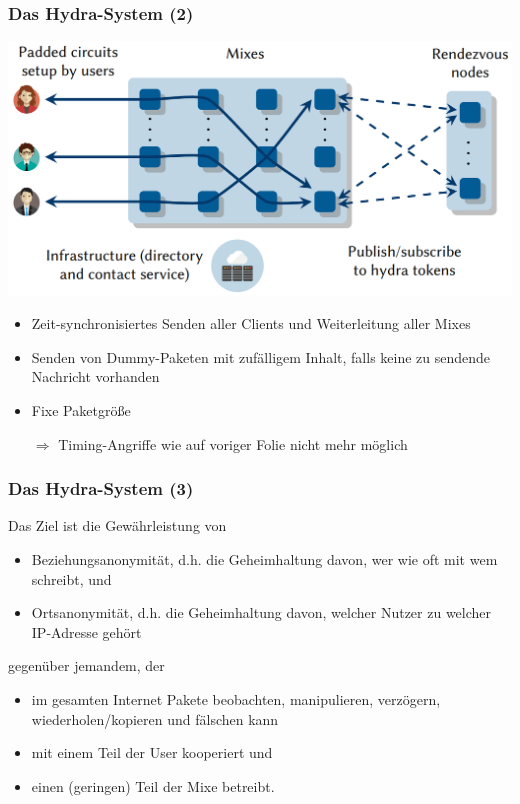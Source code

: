 \documentclass[t]{beamer}
\begin{document}
    \begin{frame}
        \frametitle{Das Hydra-System (2)}

        \centering\includegraphics[scale=0.25]{hydra_design.png}

        \begin{itemize}
            \item
                Zeit-synchronisiertes Senden aller Clients und Weiterleitung aller Mixes
                \pause

            \item
                Senden von Dummy-Paketen mit zufälligem Inhalt, falls keine zu sendende Nachricht vorhanden
                \pause

            \item
                Fixe Paketgröße
                \pause
            \item[$\Rightarrow$]
                Timing-Angriffe wie auf voriger Folie nicht mehr möglich
        \end{itemize}
    \end{frame}

    \begin{frame}
        \frametitle{Das Hydra-System (3)}
        \pause

        Das Ziel ist die Gewährleistung von
        \begin{itemize}
            \item
                Beziehungsanonymität, d.h. die Geheimhaltung davon, wer wie oft mit wem schreibt, und
                \pause

            \item
                Ortsanonymität, d.h. die Geheimhaltung davon, welcher Nutzer zu welcher IP-Adresse gehört
                \pause
        \end{itemize}

        gegenüber jemandem, der
        \begin{itemize}
            \item
                im gesamten Internet Pakete beobachten, manipulieren, verzögern, wiederholen/kopieren und fälschen kann
                \pause

            \item
                mit einem Teil der User kooperiert und
                \pause

            \item
                einen (geringen) Teil der Mixe betreibt.
        \end{itemize}
    \end{frame}
\end{document}

